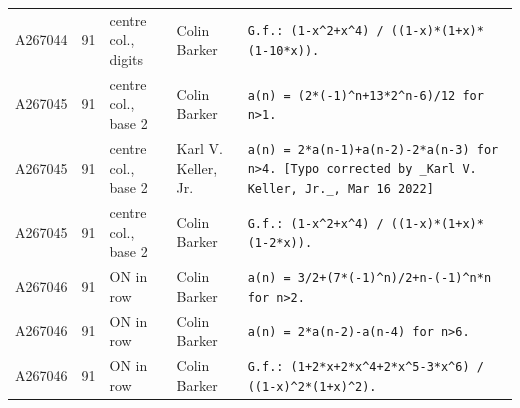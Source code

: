 \documentclass[11pt]{article}
\theoremstyle{definition}
\theoremstyle{remark}
\begin{document}
{\begin{longtable}{p{1.3cm}p{0.7cm}p{2.4cm}p{2.3cm}p{7.3cm}}
A267044 & 91 & centre col., digits & Colin Barker & \texttt{G.f.: \allowbreak{}(1-\allowbreak{}x\^{}2+\allowbreak{}x\^{}4)\allowbreak{} \allowbreak{}/\allowbreak{} \allowbreak{}((1-\allowbreak{}x)\allowbreak{}*\allowbreak{}(1+\allowbreak{}x)\allowbreak{}*\allowbreak{}(1-\allowbreak{}10*\allowbreak{}x)\allowbreak{})\allowbreak{}.} \\
A267045 & 91 & centre col., base 2 & Colin Barker & \texttt{a(n)\allowbreak{} \allowbreak{}=\allowbreak{} \allowbreak{}(2*\allowbreak{}(-\allowbreak{}1)\allowbreak{}\^{}n+\allowbreak{}13*\allowbreak{}2\^{}n-\allowbreak{}6)\allowbreak{}/\allowbreak{}12 \allowbreak{}for \allowbreak{}n>1.} \\
A267045 & 91 & centre col., base 2 & Karl V. Keller, Jr. & \texttt{a(n)\allowbreak{} \allowbreak{}=\allowbreak{} \allowbreak{}2*\allowbreak{}a(n-\allowbreak{}1)\allowbreak{}+\allowbreak{}a(n-\allowbreak{}2)\allowbreak{}-\allowbreak{}2*\allowbreak{}a(n-\allowbreak{}3)\allowbreak{} \allowbreak{}for \allowbreak{}n>4. \allowbreak{}[Typo \allowbreak{}corrected \allowbreak{}by \allowbreak{}\_Karl \allowbreak{}V. \allowbreak{}Keller,\allowbreak{} \allowbreak{}Jr.\_,\allowbreak{} \allowbreak{}Mar \allowbreak{}16 \allowbreak{}2022]} \\
A267045 & 91 & centre col., base 2 & Colin Barker & \texttt{G.f.: \allowbreak{}(1-\allowbreak{}x\^{}2+\allowbreak{}x\^{}4)\allowbreak{} \allowbreak{}/\allowbreak{} \allowbreak{}((1-\allowbreak{}x)\allowbreak{}*\allowbreak{}(1+\allowbreak{}x)\allowbreak{}*\allowbreak{}(1-\allowbreak{}2*\allowbreak{}x)\allowbreak{})\allowbreak{}.} \\
A267046 & 91 & ON in row & Colin Barker & \texttt{a(n)\allowbreak{} \allowbreak{}=\allowbreak{} \allowbreak{}3/\allowbreak{}2+\allowbreak{}(7*\allowbreak{}(-\allowbreak{}1)\allowbreak{}\^{}n)\allowbreak{}/\allowbreak{}2+\allowbreak{}n-\allowbreak{}(-\allowbreak{}1)\allowbreak{}\^{}n*\allowbreak{}n \allowbreak{}for \allowbreak{}n>2.} \\
A267046 & 91 & ON in row & Colin Barker & \texttt{a(n)\allowbreak{} \allowbreak{}=\allowbreak{} \allowbreak{}2*\allowbreak{}a(n-\allowbreak{}2)\allowbreak{}-\allowbreak{}a(n-\allowbreak{}4)\allowbreak{} \allowbreak{}for \allowbreak{}n>6.} \\
A267046 & 91 & ON in row & Colin Barker & \texttt{G.f.: \allowbreak{}(1+\allowbreak{}2*\allowbreak{}x+\allowbreak{}2*\allowbreak{}x\^{}4+\allowbreak{}2*\allowbreak{}x\^{}5-\allowbreak{}3*\allowbreak{}x\^{}6)\allowbreak{} \allowbreak{}/\allowbreak{} \allowbreak{}((1-\allowbreak{}x)\allowbreak{}\^{}2*\allowbreak{}(1+\allowbreak{}x)\allowbreak{}\^{}2)\allowbreak{}.} \\

\end{longtable}}
\end{document}

